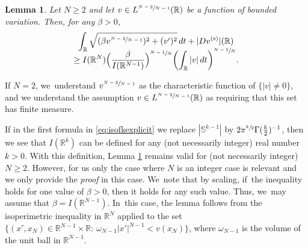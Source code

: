 \documentclass[11pt]{article}
\let\oldsfrac\sfrac
\renewcommand{\sfrac}[2]{{\oldsfrac{#1}{#2}}}
\newtheorem{lemma}[theorem]{Lemma}
\theoremstyle{definition}
\newcommand{\1}{\mathbbm{1}}
\newcommand{\R}{\mathbb{R}}
\newcommand{\Sph}{\mathbb{S}}
\numberwithin{equation}{section}
\begin{document}
\begin{lemma}\label{isocartesian}
Let $N\geq 2$ and let $v\in L^\sfrac{N-2}{N-1}(\R)$ be a function of bounded variation. Then, for any $\beta>0$,
\begin{multline*}
\int_\R \sqrt{ (\beta v^\sfrac{N-2}{N-1})^2 + (v')^2}\,dt + |Dv^{(\mathrm{s})}|(\R)\\[-8pt]
\geq I(\R^N) \Bigl(\frac{\beta}{I(\R^{N-1})}\Bigr)^\sfrac{N-1}{N} \biggl(\int_\R |v| \,dt\biggr)^\sfrac{N-1}{N}.
\end{multline*}
\end{lemma}

If $N=2$, we~understand $v^\sfrac{N-2}{N-1}$ as the characteristic function of $\{|v|\neq 0\}$, and we understand the assumption $v\in L^\sfrac{N-2}{N-1}(\R)$ as requiring that this set has finite measure.

If in the first formula in \eqref{eq:isofkexplicit} we replace $|\Sph^{k-1}|$ by $2\pi^{\sfrac k2} \Gamma(\frac k2)^{-1}$, then we see that $I(\R^k)$ can be defined for any (not necessarily integer) real number $k>0$. With this definition, Lemma \ref{isocartesian} remains valid for (not necessarily integer) $N\geq 2$. However, for us only the case where $N$ is an integer case is relevant and we only provide the \emph{proof} in this case. We~note that by scaling, if~the inequality holds for one value of $\beta>0$, then it holds for any such value. Thus, we~may assume that $\beta = I(\R^{N-1})$. In~this case, the lemma follows from the isoperimetric inequality in $\R^N$ applied to the set $\{ (x',x_N)\in\R^{N-1}\times\R:\ \omega_{N-1} |x'|^{N-1}<v(x_N)\}$, where $\omega_{N-1}$ is the volume of the unit ball in $\R^{N-1}$.
\end{document}
